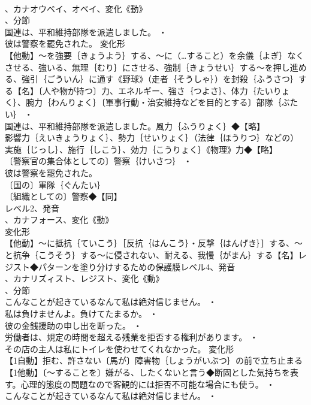 \documentclass[8pt]{extreport}
\begin{document}
\begin{CJK}{UTF8}{min}
\\	、カナオウベイ、オベイ、変化《動》
\\	、分節
\\	国連は、平和維持部隊を派遣しました。 ・
\\	彼は警察を罷免された。	変化形 
\\	【他動】～を強要｛きょうよう｝する、～に（…すること）を余儀｛よぎ｝なくさせる、強いる、無理｛むり｝にさせる、強制｛きょうせい｝する～を押し進める、強引｛ごういん｝に通す《野球》（走者｛そうしゃ｝）を封殺｛ふうさつ｝する【名】〔人や物が持つ〕力、エネルギー、強さ｛つよさ｝、体力｛たいりょく｝、腕力｛わんりょく｝〔軍事行動・治安維持などを目的とする〕部隊｛ぶたい｝ ・
\\	国連は、平和維持部隊を派遣しました。風力｛ふうりょく｝◆【略】
\\	影響力｛えいきょうりょく｝、勢力｛せいりょく｝（法律｛ほうりつ｝などの）実施｛じっし｝、施行｛しこう｝、効力｛こうりょく｝《物理》力◆【略】
\\	〔警察官の集合体としての〕警察｛けいさつ｝ ・
\\	彼は警察を罷免された。
\\	〔国の〕軍隊｛ぐんたい｝
\\	〔組織としての〕警察◆【同】
\\	レベル2、発音
\\	、カナフォース、変化《動》
\\	変化形 
\\	【他動】～に抵抗｛ていこう｝［反抗｛はんこう｝・反撃｛はんげき｝］する、～と抗争｛こうそう｝する～に侵されない、耐える、我慢｛がまん｝する【名】レジスト◆パターンを塗り分けするための保護膜レベル4、発音
\\	、カナリズィスト、レジスト、変化《動》
\\	、分節
\\	こんなことが起きているなんて私は絶対信じません。 ・
\\	私は負けませんよ。負けてたまるか。 ・
\\	彼の金銭援助の申し出を断った。 ・
\\	労働者は、規定の時間を超える残業を拒否する権利があります。 ・
\\	その店の主人は私にトイレを使わせてくれなかった。	変化形 
\\	【1自動】拒む、許さない〔馬が〕障害物｛しょうがいぶつ｝の前で立ち止まる【1他動】〔～することを〕嫌がる、したくないと言う◆断固とした気持ちを表す。心理的態度の問題なので客観的には拒否不可能な場合にも使う。 ・
\\	こんなことが起きているなんて私は絶対信じません。 ・

\end{CJK}
\end{document}
